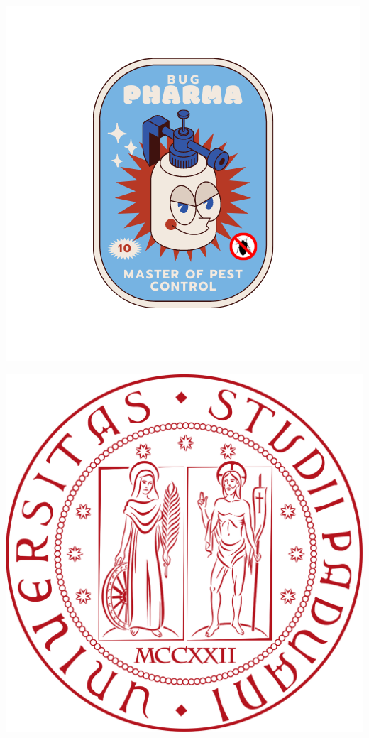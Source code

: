 \documentclass[11pt]{letter}
\date{17 Novembre 2021}
\begin{document}
	\begin{letter}{}	
		\begin{minipage}{0.5\textwidth}
			\includegraphics[scale = 0.5, left]{../Res/BugPharma_Logo.png}
		\end{minipage}
		\begin{minipage}{0.5\textwidth}
			\includegraphics[scale = 0.1, right]{../Res/logo_unipd.png}

\end{minipage}
\end{letter}
\end{document}
